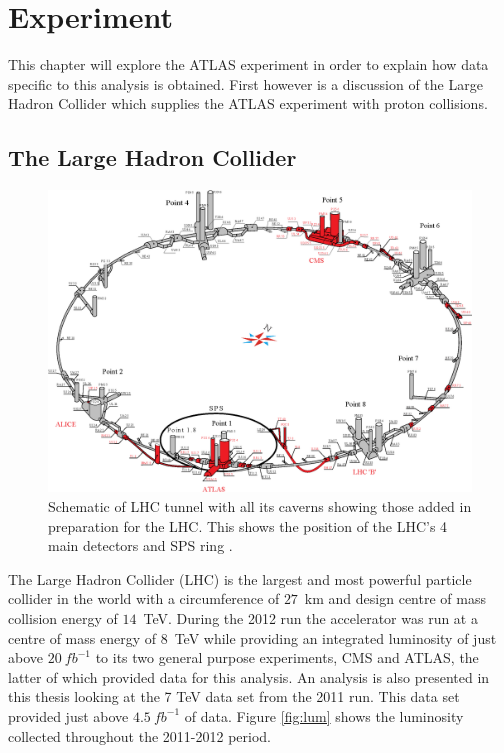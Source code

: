 \chapter{Experiment}

	This chapter will explore the ATLAS experiment in order to explain how data specific to this analysis is obtained. First however is a discussion of the Large Hadron Collider which supplies the ATLAS experiment with proton collisions.

\section{The Large Hadron Collider}

	\begin{figure}[h!]
        \begin{center}
            \includegraphics[width=0.9\linewidth]{images/LHCUnder_new.eps}
        \end{center}
        \caption{Schematic of LHC tunnel with all its caverns showing those added in preparation for the LHC. This shows the position of the LHC's 4 main detectors and SPS ring \cite{1367.2630.9.9.335}.}
        \label{fig:experimentLHC}
    \end{figure}

	The Large Hadron Collider (LHC) \cite{Bruning:782076} is the largest and most powerful particle collider in the world with a circumference of $27$~km and design centre of mass collision energy of $14$~TeV. During the 2012 run the accelerator was run at a centre of mass energy of $8$~TeV while providing an integrated luminosity of just above $20~fb^{-1}$ to its two general purpose experiments, CMS and ATLAS, the latter of which provided data for this analysis. An analysis is also presented in this thesis looking at the 7 TeV data set from the 2011 run. This data set provided just above $4.5~fb^{-1}$ of data. Figure \ref{fig:lum} shows the luminosity collected throughout the 2011-2012 period. 

